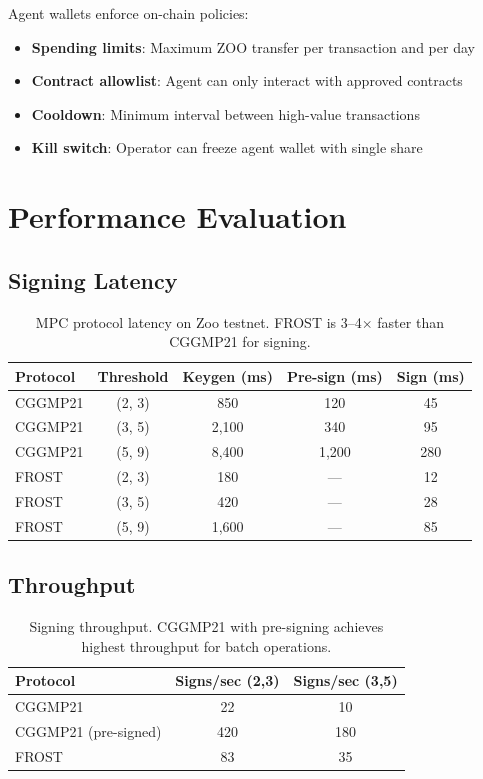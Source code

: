 \documentclass[11pt,letterpaper]{article}
\begin{document}
Agent wallets enforce on-chain policies:

\begin{itemize}
    \item \textbf{Spending limits}: Maximum ZOO transfer per transaction and per day
    \item \textbf{Contract allowlist}: Agent can only interact with approved contracts
    \item \textbf{Cooldown}: Minimum interval between high-value transactions
    \item \textbf{Kill switch}: Operator can freeze agent wallet with single share
\end{itemize}

\section{Performance Evaluation}
\label{sec:evaluation}

\subsection{Signing Latency}

\begin{table}[t]
\centering
\begin{tabular}{lcccc}
\toprule
\textbf{Protocol} & \textbf{Threshold} & \textbf{Keygen (ms)} & \textbf{Pre-sign (ms)} & \textbf{Sign (ms)} \\
\midrule
CGGMP21 & (2, 3) & 850 & 120 & 45 \\
CGGMP21 & (3, 5) & 2,100 & 340 & 95 \\
CGGMP21 & (5, 9) & 8,400 & 1,200 & 280 \\
FROST & (2, 3) & 180 & --- & 12 \\
FROST & (3, 5) & 420 & --- & 28 \\
FROST & (5, 9) & 1,600 & --- & 85 \\
\bottomrule
\end{tabular}
\caption{MPC protocol latency on Zoo testnet. FROST is 3--4$\times$ faster than CGGMP21 for signing.}
\label{tab:latency}
\end{table}

\subsection{Throughput}

\begin{table}[t]
\centering
\begin{tabular}{lcc}
\toprule
\textbf{Protocol} & \textbf{Signs/sec (2,3)} & \textbf{Signs/sec (3,5)} \\
\midrule
CGGMP21 & 22 & 10 \\
CGGMP21 (pre-signed) & 420 & 180 \\
FROST & 83 & 35 \\
\bottomrule
\end{tabular}
\caption{Signing throughput. CGGMP21 with pre-signing achieves highest throughput for batch operations.}
\label{tab:throughput}
\end{table}
\end{document}

